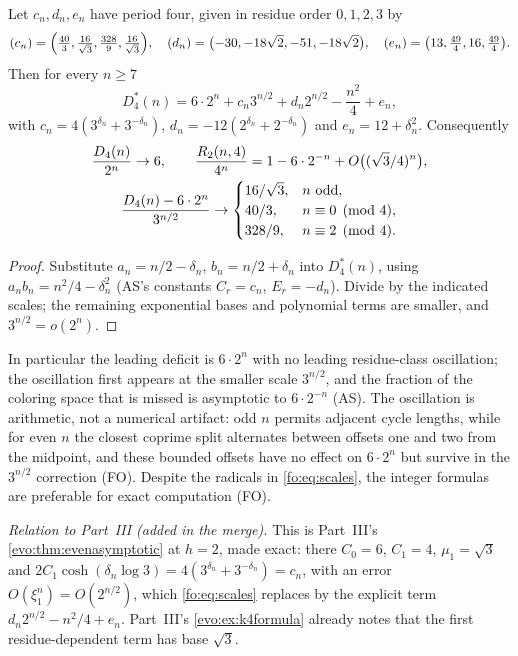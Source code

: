 \documentclass[11pt,a4paper]{article}
\numberwithin{equation}{section}
\theoremstyle{definition}
\theoremstyle{remark}
\begin{document}
\begin{proposition}\label{fo:prop:scales}
Let $c_n,d_n,e_n$ have period four, given in residue order $0,1,2,3$ by
\[
 (c_n)=\Bigl(\tfrac{40}{3},\tfrac{16}{\sqrt3},\tfrac{328}{9},\tfrac{16}{\sqrt3}\Bigr),\quad
 (d_n)=\bigl(-30,-18\sqrt2,-51,-18\sqrt2\bigr),\quad
 (e_n)=\bigl(13,\tfrac{49}{4},16,\tfrac{49}{4}\bigr).
\]
Then for every $n\ge7$
\begin{equation}\label{fo:eq:scales}
 D^*_4(n)=6\cdot2^n+c_n3^{n/2}+d_n2^{n/2}-\frac{n^2}{4}+e_n,
\end{equation}
with $c_n=4(3^{\delta_n}+3^{-\delta_n})$, $d_n=-12(2^{\delta_n}+2^{-\delta_n})$
and $e_n=12+\delta_n^2$. Consequently
\begin{gather}
 \frac{D_4(n)}{2^n}\to6,\qquad
 \frac{R_2(n,4)}{4^n}=1-6\cdot2^{-n}+O\bigl((\sqrt3/4)^n\bigr),\notag\\
 \frac{D_4(n)-6\cdot2^n}{3^{n/2}}\to
 \begin{cases}16/\sqrt3,&n\text{ odd},\\40/3,&n\equiv0\pmod4,\\328/9,&n\equiv2\pmod4.\end{cases}
 \label{fo:eq:asymptotic}
\end{gather}
\end{proposition}

\begin{proof}
Substitute $a_n=n/2-\delta_n$, $b_n=n/2+\delta_n$ into $D^*_4(n)$, using
$a_nb_n=n^2/4-\delta_n^2$ (AS's constants $C_r=c_n$, $E_r=-d_n$). Divide by
the indicated scales; the remaining exponential bases and polynomial terms
are smaller, and $3^{n/2}=o(2^n)$.
\end{proof}

In particular the leading deficit is $6\cdot2^n$ with no leading residue-class
oscillation; the oscillation first appears at the smaller scale $3^{n/2}$,
and the fraction of the coloring space that is missed is asymptotic to
$6\cdot2^{-n}$ (AS). The oscillation is arithmetic, not a numerical artifact:
odd $n$ permits adjacent cycle lengths, while for even $n$ the closest
coprime split alternates between offsets one and two from the midpoint, and
these bounded offsets have no effect on $6\cdot2^n$ but survive in the
$3^{n/2}$ correction (FO). Despite the radicals in \eqref{fo:eq:scales}, the
integer formulas are preferable for exact computation (FO).

\emph{Relation to Part~III (added in the merge).} This is Part~III's
\cref{evo:thm:evenasymptotic} at $h=2$, made exact: there $C_0=6$, $C_1=4$,
$\mu_1=\sqrt3$ and $2C_1\cosh(\delta_n\log3)=4(3^{\delta_n}+3^{-\delta_n})=c_n$,
with an error $O(\xi_1^n)=O(2^{n/2})$, which \eqref{fo:eq:scales} replaces by
the explicit term $d_n2^{n/2}-n^2/4+e_n$. Part~III's
\cref{evo:ex:k4formula} already notes that the first residue-dependent term
has base $\sqrt3$.
\end{document}
